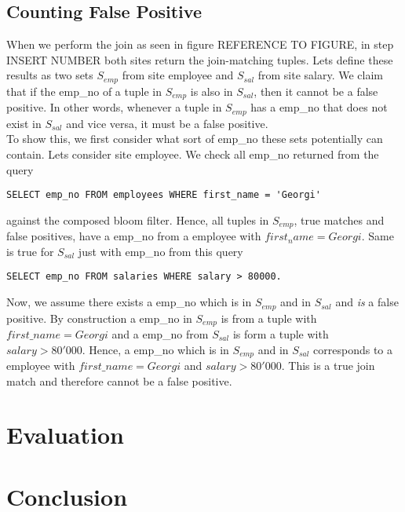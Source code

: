 \documentclass[12]{scrartcl}
\begin{document}
\subsection{Counting False Positive}
When we perform the join as seen in figure REFERENCE TO FIGURE, in step INSERT NUMBER both sites return the join-matching tuples. Lets define these results as two sets $S_{emp}$ from site employee and $S_{sal}$ from site salary. We claim that if the emp\_no of a tuple in $S_{emp}$ is also in $S_{sal}$, then it cannot be a false positive. In other words, whenever a tuple in $S_{emp}$ has a emp\_no that does not exist in $S_{sal}$ and vice versa, it must be a false positive. \\
To show this, we first consider what sort of emp\_no these sets potentially can contain. Lets consider site employee. We check all emp\_no returned from the query
\begin{verbatim}
SELECT emp_no FROM employees WHERE first_name = 'Georgi'
\end{verbatim}
against the composed bloom filter. Hence, all tuples in $S_{emp}$, true matches and false positives, have a emp\_no from a employee with $first_name = Georgi$. Same is true for $S_{sal}$ just with emp\_no from this query 
\begin{verbatim}
SELECT emp_no FROM salaries WHERE salary > 80000.
\end{verbatim}
Now, we assume there exists a emp\_no which is in $S_{emp}$ and in $S_{sal}$ and \emph{is} a false positive. By construction a emp\_no in $S_{emp}$ is from a tuple with $first\_name = Georgi$ and a emp\_no from $S_{sal}$ is form a tuple with $salary > 80'000$. Hence, a emp\_no which is in $S_{emp}$ and in $S_{sal}$ corresponds to a employee with $first\_name = Georgi$ and $salary > 80'000$. This is a true join match and therefore cannot be a false positive.


\section{Evaluation}

\section{Conclusion}
\end{document}

